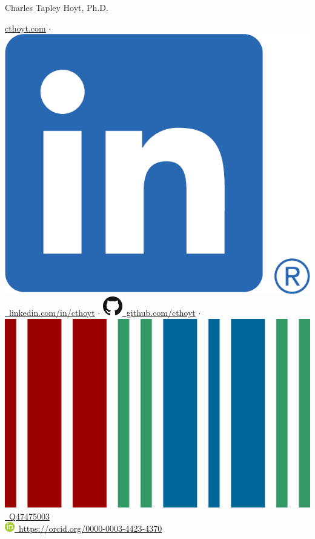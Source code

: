 \documentclass[10pt,a4paper,sans]{moderncv} %
\newcommand{\wikidata}[2]{\href{https://bioregistry.io/wikidata:#1?provider=scholia}{{#2}}}
\begin{document}
{\Huge Charles Tapley Hoyt, Ph.D.}

\vspace{3mm}

\href{https://cthoyt.com}{cthoyt.com}
    $\cdot$ \href{https://linkedin.com/in/cthoyt}{\includegraphics[scale=0.055]{img/LI-In-Bug}\
    linkedin.com/in/cthoyt}
    $\cdot$ \href{https://github.com/cthoyt}{\includegraphics[scale=0.25]{img/GitHub-Mark-32px}\
    github.com/cthoyt}
    $\cdot$ \wikidata{Q47475003}{\includegraphics[scale=0.01]{img/wikidata_logo}\ Q47475003}
\\
\href{https://orcid.org/0000-0003-4423-4370}{\includegraphics[scale=0.5]{img/ORCIDiD_icon16x16}\ https://orcid.org/0000-0003-4423-4370}
\end{document}
